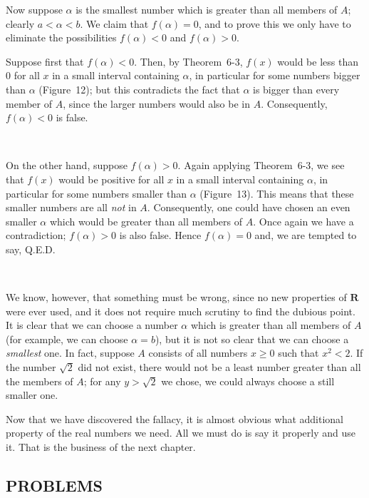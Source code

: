 Now suppose $\alpha$ is the smallest number which is greater than all members
of $A$; clearly $a<\alpha<b$. We claim that $f(\alpha)=0$, and to prove this we
only have to eliminate the possibilities $f(\alpha)<0$ and $f(\alpha)>0$.

Suppose first that $f(\alpha)<0$. Then, by Theorem~6-3, $f(x)$ would be less
than $0$ for all $x$ in a small interval containing $\alpha$, in particular for
some numbers bigger than $\alpha$ (Figure~12); but this contradicts the fact
that $\alpha$ is bigger than every member of $A$, since the larger numbers
would also be in $A$. Consequently, $f(\alpha)<0$ is false.
\begin{center}
\\[0.6em]
\end{center}

On the other hand, suppose $f(\alpha)>0$. Again applying Theorem~6-3, we see
that $f(x)$ would be positive for all $x$ in a small interval containing
$\alpha$, in particular for some numbers smaller than $\alpha$ (Figure~13).
This means that these smaller numbers are all \emph{not} in $A$. Consequently,
one could have chosen an even smaller $\alpha$ which would be greater than all
members of $A$. Once again we have a contradiction; $f(\alpha)>0$ is also
false. Hence $f(\alpha)=0$ and, we are tempted to say, Q.E.D.
\begin{center}
\\[0.6em]
\end{center}

We know, however, that something must be wrong, since no new properties of
$\mathbf{R}$ were ever used, and it does not require much scrutiny to find the
dubious point. It is clear that we can choose a number $\alpha$ which is
greater than all members of $A$ (for example, we can choose $\alpha=b$), but it
is not so clear that we can choose a \emph{smallest} one. In fact, suppose $A$
consists of all numbers $x\geq 0$ such that $x^2<2$. If the number $\sqrt{2}$
did not exist, there would not be a least number greater than all the members
of $A$; for any $y>\sqrt{2}$ we chose, we could always choose a still smaller
one.

Now that we have discovered the fallacy, it is almost obvious what additional
property of the real numbers we need. All we must do is say it properly and use
it. That is the business of the next chapter.

\subsection*{PROBLEMS}

